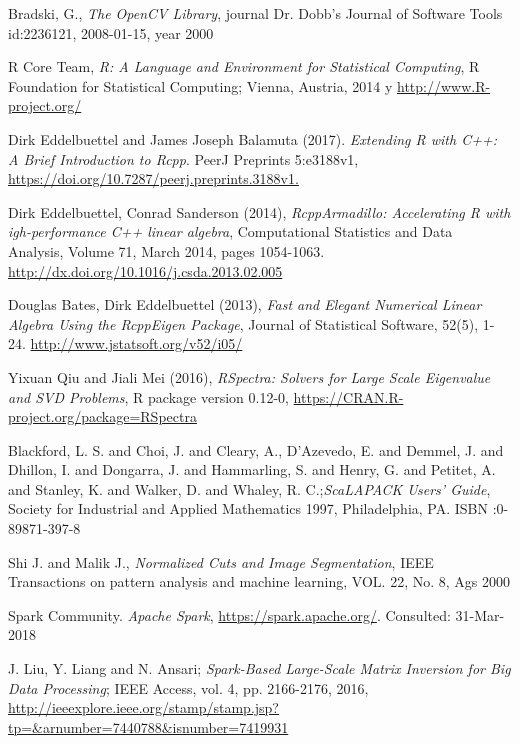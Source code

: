\documentclass[conference]{IEEEtran}
\begin{document}
\begin{thebibliography}{1}
Bradski, G., \emph{The OpenCV Library}, journal Dr. Dobb's Journal of Software Tools id:2236121, 2008-01-15, year 2000

R Core Team, \emph{R: A Language and Environment for Statistical Computing}, R Foundation for Statistical Computing; Vienna, Austria, 2014 y  \url {http://www.R-project.org/}

Dirk Eddelbuettel and James Joseph Balamuta (2017). \emph{Extending R with C++: A Brief Introduction to Rcpp}. PeerJ Preprints 5:e3188v1, \url{https://doi.org/10.7287/peerj.preprints.3188v1.}

Dirk Eddelbuettel, Conrad Sanderson (2014), \emph{RcppArmadillo: Accelerating R with igh-performance C++ linear algebra}, Computational Statistics and Data Analysis, Volume 71, March 2014, pages 1054-1063. \url{
  http://dx.doi.org/10.1016/j.csda.2013.02.005}

Douglas Bates, Dirk Eddelbuettel (2013), \emph{Fast and Elegant Numerical Linear Algebra Using the RcppEigen Package}, Journal of Statistical Software, 52(5), 1-24. \url{http://www.jstatsoft.org/v52/i05/}

Yixuan Qiu and Jiali Mei (2016), \emph{RSpectra: Solvers for Large Scale Eigenvalue and SVD Problems}, R package version 0.12-0, \url{https://CRAN.R-project.org/package=RSpectra}

Blackford, L. S. and Choi, J. and Cleary, A., D'Azevedo, E. and Demmel, J. and Dhillon, I. and Dongarra, J. and Hammarling, S. and Henry, G. and Petitet, A. and Stanley, K. and Walker, D. and Whaley, R. C.;\emph{ScaLAPACK Users' Guide}, Society for Industrial and Applied Mathematics 1997,
Philadelphia, PA. ISBN :0-89871-397-8  

Shi J. and Malik J., \emph{Normalized Cuts and Image Segmentation}, IEEE Transactions on pattern analysis and machine learning, VOL. 22, No. 8, Ags 2000

Spark Community. \emph{Apache Spark},  \url{https://spark.apache.org/}. Consulted: 31-Mar-2018

J. Liu, Y. Liang and N. Ansari; \emph{Spark-Based Large-Scale Matrix Inversion for Big Data Processing}; IEEE Access, vol. 4, pp. 2166-2176, 2016, \url{http://ieeexplore.ieee.org/stamp/stamp.jsp?tp=&arnumber=7440788&isnumber=7419931}

\end{thebibliography}
\end{document}
